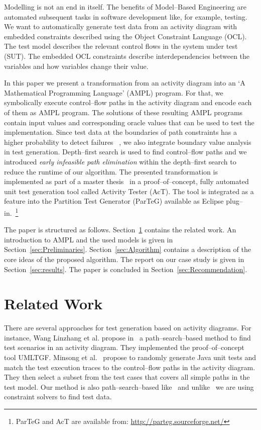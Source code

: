 \documentclass[runningheads,a4paper]{llncs}%
\begin{document}
Modelling is not an end in itself. The benefits of Model--Based Engineering are
automated subsequent tasks in software development like, for example, testing.
We want to automatically generate test data from an activity diagram with
embedded constraints described using the Object Constraint Language (OCL). The
test model describes the relevant control flows in the system under test (SUT).
The embedded OCL constraints describe interdependencies between the variables
and how variables change their value.

In this paper we present a transformation from an activity diagram into an `A
Mathematical Programming Language' (AMPL) program. For that, we symbolically
execute control--flow paths in the activity diagram and encode each of them as
AMPL program. The solutions of these resulting AMPL programs contain input
values and corresponding oracle values that can be used to test the
implementation. Since test data at the boundaries of path constraints has a
higher probability to detect failures ~\cite{Kosmatov04BoundaryCoverageCrit}, we
also integrate boundary value analysis in test generation. Depth--first search
is used to find control--flow paths and we introduced \emph{early infeasible
path elimination} within the depth--first search to reduce the runtime of our
algorithm. The presented transformation is implemented as part of a master
thesis~\cite{Kurth2014AutomatedGen} in a proof--of--concept, fully automated
unit test generation tool called Activity Tester (AcT). The tool is integrated
as a feature into the Partition Test Generator (ParTeG) available as Eclipse
plug--in.~\footnote{ParTeG and AcT are available from:
\href{http://parteg.sourceforge.net/}{http://parteg.sourceforge.net/}}

The paper is structured as follows. Section~\ref{sec:LiteratureReview} contains
the related work. An introduction to AMPL and the used models is given in
Section~\ref{sec:Preliminaries}. Section~\ref{sec:Algorithm} contains a
description of the core ideas of the proposed algorithm. The report on our case
study is given in Section~\ref{sec:results}. The paper is concluded in
Section~\ref{sec:Recommendation}.%
%
\section{Related Work}%
\label{sec:LiteratureReview}%
There are several approaches for test generation based on activity diagrams. For
instance, Wang Linzhang et al. propose
in~\cite{Linzhang04GeneratingTestCasefromActivityGrayBoxMethod} a
path--search--based method to find test scenarios in an activity diagram. They
implemented the proof--of--concept tool UMLTGF. Minsong et
al.~\cite{mingsong2006automatic} propose to randomly generate Java unit tests
and match the test execution traces to the control--flow paths in the activity
diagram. They then select a subset from the test cases that covers all simple
paths in the test model. Our method is also path--search--based
like~\cite{Linzhang04GeneratingTestCasefromActivityGrayBoxMethod} and
unlike~\cite{mingsong2006automatic} we are using constraint solvers to find test
data.
\end{document}
